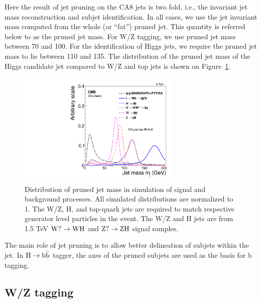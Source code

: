 Here the result of jet pruning on the CA8 jets is two fold, i.e., the invariant jet mass 
reconstruction and subjet identification.
In all cases,
we use the jet invariant mass computed from the whole (or ``fat'') 
pruned jet.  This quantity is referred below to as the pruned jet mass.
For W/Z tagging, we use pruned jet mass between 70 and 100\GeVcc. 
For the identification of Higgs jets, we require the pruned jet mass to
lie between 110 and 135\GeVcc.  The distribution of the pruned jet
mass of the Higgs candidate jet 
compared to W/Z and top jets is shown on Figure~\ref{fig:JetMassTagging}. 


\begin{figure}[htb]
\begin{center}
\includegraphics[width=0.69\textwidth]{EXO-14-009/HbbZqqfigs/Signal/signal-data-qcd-jetmass.pdf}
\end{center}
\caption{
Distribution of pruned jet mass in simulation of signal and background processes. All simulated distributions are normalized to 1. The W/Z, H, and top-quark jets are required to match respective generator level particles in the event. The W/Z and H jets are from 
1.5 TeV ${\rm W? \to WH}$ and ${\rm Z? \to ZH}$ signal samples. 
} 
\label{fig:JetMassTagging}
\end{figure}


The main role of jet pruning is to allow better delineation of subjets
within the jet.  In ${\rm H \to b\bar{b}}$ tagger, the axes of the 
pruned subjets are used as the basis for b tagging.



\subsection{W/Z tagging  } 
\label{sec:wztagging}

